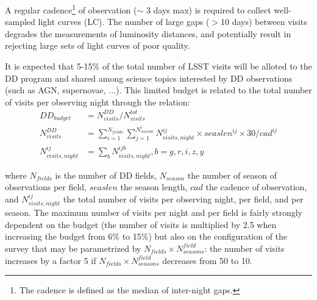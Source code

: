 \documentclass[skiphelvet,twocolumn]{lsstdescnote}
\begin{document}
\par
A regular cadence\footnote{The cadence is defined as the median of inter-night gaps.} of observation ($\sim$ 3 days max) is required to collect well-sampled light curves (LC). The number of large gaps ($>$10 days) between visits degrades the 
measurements of luminosity distances, and potentially result in rejecting large sets of light curves of poor quality.
\par
It is expected that 5-15$\%$ of the total number of LSST visits will be alloted to the DD program and shared among science topics interested by DD observations (such as AGN, supernovae, ...).  This limited budget is related to the total number of visits per observing night through the relation:
\begin{equation}\label{eq:ddbudget}
\begin{aligned}
DD_{budget} &= N_{visits}^{DD}/N_{visits}^{tot} \\
  N_{visits}^{DD} &= \sum_{i=1}^{N_{fields}} \sum_{ j=1}^{N_{season}^i} N_{visits,night}^{ij}\times seaslen^{ij}\times 30/cad^{ij} \\
  N_{visits,night}^{ij} &=  \sum_{b} N_{visits,night}^{ijb}   , b=g,r,i,z,y
 \end{aligned}
 \end{equation}

where $N_{fields}$ is the number of DD fields, $N_{season}$ the number of season of observations per field, $seaslen$ the season length, $cad$ the cadence of observation, and $N_{visits, night}^{ij}$ the total number of visits per observing night, per field, and per season. The maximum number of visits per night and per field is fairly strongly dependent on the budget (the number of visits is multiplied by 2.5 when increasing the budget from 6\% to 15\%) but also on the configuration of the survey that may be parametrized by $N_{fields}\times N_{seasons}^{field}$: the number of visits increases by a factor 5 if $N_{fields}\times N_{seasons}^{field}$ decreases from 50 to 10.
\end{document}
